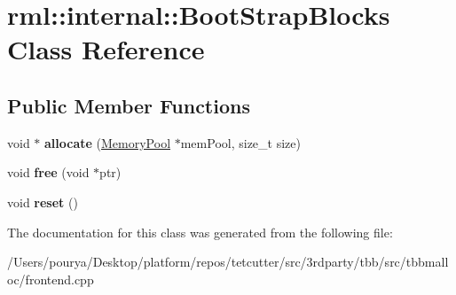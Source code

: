 \hypertarget{classrml_1_1internal_1_1BootStrapBlocks}{}\section{rml\+:\+:internal\+:\+:Boot\+Strap\+Blocks Class Reference}
\label{classrml_1_1internal_1_1BootStrapBlocks}
\subsection*{Public Member Functions}
\begin{DoxyCompactItemize}
\item 
\hypertarget{classrml_1_1internal_1_1BootStrapBlocks_ac04f5dfb5527488b55c491957dc8ec66}{}void $\ast$ {\bfseries allocate} (\hyperlink{classrml_1_1internal_1_1MemoryPool}{Memory\+Pool} $\ast$mem\+Pool, size\+\_\+t size)\label{classrml_1_1internal_1_1BootStrapBlocks_ac04f5dfb5527488b55c491957dc8ec66}

\item 
\hypertarget{classrml_1_1internal_1_1BootStrapBlocks_a77ebf6da50eb9bb839ba9585186df6c5}{}void {\bfseries free} (void $\ast$ptr)\label{classrml_1_1internal_1_1BootStrapBlocks_a77ebf6da50eb9bb839ba9585186df6c5}

\item 
\hypertarget{classrml_1_1internal_1_1BootStrapBlocks_addc591467d1fb49018fd5dd05943b114}{}void {\bfseries reset} ()\label{classrml_1_1internal_1_1BootStrapBlocks_addc591467d1fb49018fd5dd05943b114}

\end{DoxyCompactItemize}


The documentation for this class was generated from the following file\+:\begin{DoxyCompactItemize}
\item 
/\+Users/pourya/\+Desktop/platform/repos/tetcutter/src/3rdparty/tbb/src/tbbmalloc/frontend.\+cpp\end{DoxyCompactItemize}
